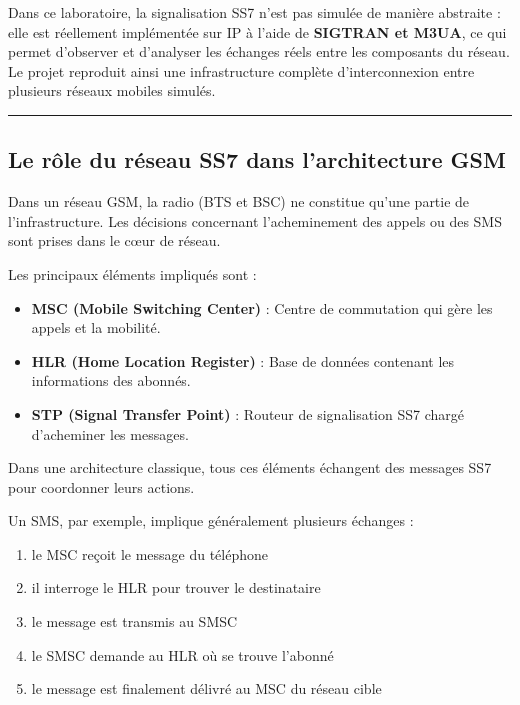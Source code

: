 \documentclass[
]{article}
\providecommand{\tightlist}{%
  \setlength{\itemsep}{0pt}\setlength{\parskip}{0pt}}
\begin{document}
Dans ce laboratoire, la signalisation SS7 n'est pas simulée de manière
abstraite : elle est réellement implémentée sur IP à l'aide de
\textbf{SIGTRAN et M3UA}, ce qui permet d'observer et d'analyser les
échanges réels entre les composants du réseau. Le projet reproduit ainsi
une infrastructure complète d'interconnexion entre plusieurs réseaux
mobiles simulés.

\begin{center}\rule{0.5\linewidth}{0.5pt}\end{center}

\subsection{Le rôle du réseau SS7 dans l'architecture
GSM}\label{le-ruxf4le-du-ruxe9seau-ss7-dans-larchitecture-gsm}

Dans un réseau GSM, la radio (BTS et BSC) ne constitue qu'une partie de
l'infrastructure. Les décisions concernant l'acheminement des appels ou
des SMS sont prises dans le cœur de réseau.

Les principaux éléments impliqués sont :

\begin{itemize}
\tightlist
\item
  \textbf{MSC (Mobile Switching Center)} : Centre de commutation qui
  gère les appels et la mobilité.
\item
  \textbf{HLR (Home Location Register)} : Base de données contenant les
  informations des abonnés.
\item
  \textbf{STP (Signal Transfer Point)} : Routeur de signalisation SS7
  chargé d'acheminer les messages.
\end{itemize}

Dans une architecture classique, tous ces éléments échangent des
messages SS7 pour coordonner leurs actions.

Un SMS, par exemple, implique généralement plusieurs échanges :

\begin{enumerate}
\def\labelenumi{\arabic{enumi}.}
\tightlist
\item
  le MSC reçoit le message du téléphone
\item
  il interroge le HLR pour trouver le destinataire
\item
  le message est transmis au SMSC
\item
  le SMSC demande au HLR où se trouve l'abonné
\item
  le message est finalement délivré au MSC du réseau cible
\end{enumerate}
\end{document}
